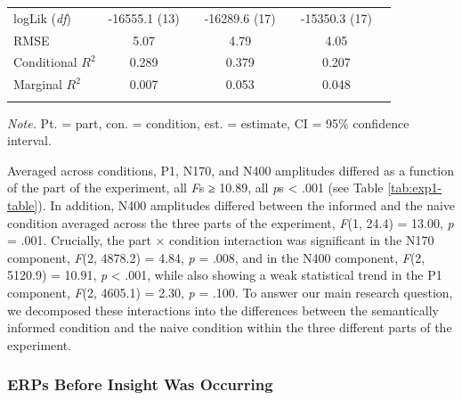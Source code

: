 \documentclass[
  english,
  doc,12pt,twoside,floatsintext]{apa7}
\begin{document}
\begin{table}[tbp]
\begin{center}
\begin{threeparttable}
{\begin{tabular}{lcccccc}
logLik (\textit{df}) & -16555.1 (13) &  & -16289.6 (17) &  & -15350.3 (17) & \\
RMSE & 5.07 &  & 4.79 &  & 4.05 & \\
Conditional $R^2$ & 0.289 &  & 0.379 &  & 0.207 & \\
Marginal $R^2$ & 0.007 &  & 0.053 &  & 0.048 & \\
\bottomrule
\addlinespace
\end{tabular}

}

\begin{tablenotes}[para]
\normalsize{\textit{Note.} Pt. = part, con. = condition, est. = estimate, CI = 95\% confidence interval.}
\end{tablenotes}

\end{threeparttable}
\end{center}

\end{table}

Averaged across conditions, P1, N170, and N400 amplitudes differed as a function of the part of the experiment, all \emph{F}s ≥ 10.89, all \emph{p}s \textless{} .001 (see Table \ref{tab:exp1-table}). In addition, N400 amplitudes differed between the informed and the naive condition averaged across the three parts of the experiment, \emph{F}(1, 24.4) = 13.00, \emph{p} = .001. Crucially, the part × condition interaction was significant in the N170 component, \emph{F}(2, 4878.2) = 4.84, \emph{p} = .008, and in the N400 component, \emph{F}(2, 5120.9) = 10.91, \emph{p} \textless{} .001, while also showing a weak statistical trend in the P1 component, \emph{F}(2, 4605.1) = 2.30, \emph{p} = .100. To answer our main research question, we decomposed these interactions into the differences between the semantically informed condition and the naive condition within the three different parts of the experiment.

\hypertarget{erps-before-insight-was-occurring}{%
\subsubsection{ERPs Before Insight Was Occurring}\label{erps-before-insight-was-occurring}}
\end{document}
